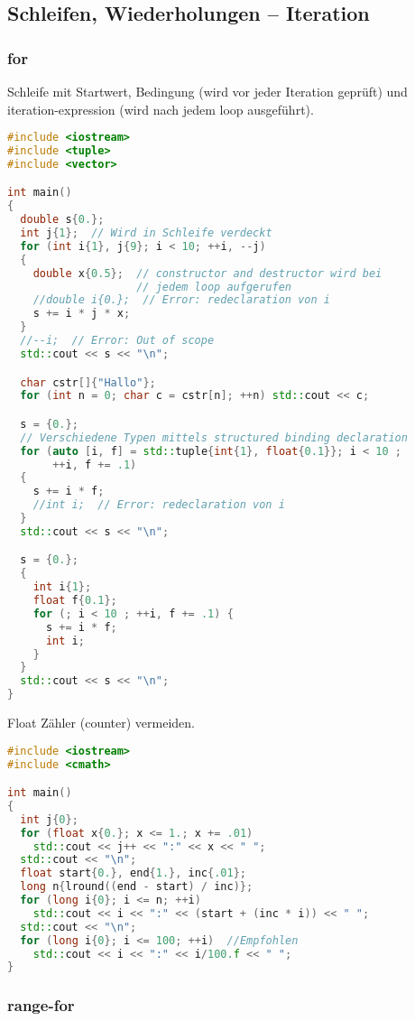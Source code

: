 \documentclass[10pt,twocolumn]{scrartcl}
\begin{document}
\subsection{Schleifen, Wiederholungen -- Iteration}
\subsubsection{for}

Schleife mit Startwert, Bedingung (wird vor jeder Iteration geprüft) und
iteration-expression (wird nach jedem loop ausgeführt).

\begin{lstlisting}[language=C++]
#include <iostream>
#include <tuple>
#include <vector>

int main()
{
  double s{0.};
  int j{1};  // Wird in Schleife verdeckt
  for (int i{1}, j{9}; i < 10; ++i, --j)
  {
    double x{0.5};  // constructor and destructor wird bei
                    // jedem loop aufgerufen
    //double i{0.};  // Error: redeclaration von i
    s += i * j * x;
  }
  //--i;  // Error: Out of scope
  std::cout << s << "\n";

  char cstr[]{"Hallo"};
  for (int n = 0; char c = cstr[n]; ++n) std::cout << c;

  s = {0.};
  // Verschiedene Typen mittels structured binding declaration
  for (auto [i, f] = std::tuple{int{1}, float{0.1}}; i < 10 ;
       ++i, f += .1)
  {
    s += i * f;
    //int i;  // Error: redeclaration von i
  }
  std::cout << s << "\n";

  s = {0.};
  {
    int i{1};
    float f{0.1};
    for (; i < 10 ; ++i, f += .1) {
      s += i * f;
      int i;
    }
  }
  std::cout << s << "\n";
}
\end{lstlisting}

Float Zähler (counter) vermeiden.

\begin{lstlisting}[language=C++]
#include <iostream>
#include <cmath>

int main()
{
  int j{0};
  for (float x{0.}; x <= 1.; x += .01)
    std::cout << j++ << ":" << x << " ";
  std::cout << "\n";
  float start{0.}, end{1.}, inc{.01};
  long n{lround((end - start) / inc)};
  for (long i{0}; i <= n; ++i)
    std::cout << i << ":" << (start + (inc * i)) << " ";
  std::cout << "\n";
  for (long i{0}; i <= 100; ++i)  //Empfohlen
    std::cout << i << ":" << i/100.f << " ";
}
\end{lstlisting}

\subsubsection{range-for}
\end{document}
